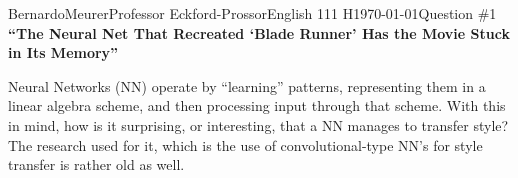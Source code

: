 \documentclass[12pt,letterpaper]{article}
\begin{document}
\begin{mla}{Bernardo}{Meurer}{Professor Eckford-Prossor}{English 111 H}{\today}{Question \#1}
    \noindent\textbf{``The Neural Net That Recreated ‘Blade Runner’ Has the Movie Stuck in Its Memory''}

    Neural Networks (NN) operate by ``learning'' patterns, representing them in a linear algebra scheme, and then processing input through that scheme. With this in mind, how is it surprising, or interesting, that a NN manages to transfer style? The research used for it, which is the use of convolutional-type NN's for style transfer is rather old as well.
\end{mla}
\end{document}

